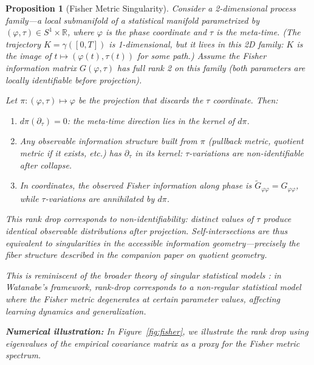 \documentclass[12pt]{article}
\newtheorem{proposition}[theorem]{Proposition}
\newcommand{\R}{\mathbb{R}}
\begin{document}
\begin{proposition}[Fisher Metric Singularity]\label{prop:fisher}
Consider a 2-dimensional process family---a local submanifold of a statistical manifold parametrized by $(\varphi, \tau) \in S^1 \times \R$, where $\varphi$ is the phase coordinate and $\tau$ is the meta-time. (The trajectory $K = \gamma([0,T])$ is 1-dimensional, but it lives in this 2D family: $K$ is the image of $t \mapsto (\varphi(t), \tau(t))$ for some path.) Assume the Fisher information matrix $G(\varphi, \tau)$ has full rank 2 on this family (both parameters are locally identifiable before projection).

Let $\pi: (\varphi, \tau) \mapsto \varphi$ be the projection that discards the $\tau$ coordinate. Then:
\begin{enumerate}
    \item[(i)] $d\pi(\partial_\tau) = 0$: the meta-time direction lies in the kernel of $d\pi$.
    \item[(ii)] Any observable information structure built from $\pi$ (pullback metric, quotient metric if it exists, etc.) has $\partial_\tau$ in its kernel: $\tau$-variations are \emph{non-identifiable} after collapse.
    \item[(iii)] In coordinates, the observed Fisher information along phase is $\tilde{G}_{\varphi\varphi} = G_{\varphi\varphi}$, while $\tau$-variations are annihilated by $d\pi$.
\end{enumerate}

This rank drop corresponds to \emph{non-identifiability}: distinct values of $\tau$ produce identical observable distributions after projection. Self-intersections are thus equivalent to singularities in the accessible information geometry---precisely the fiber structure described in the companion paper on quotient geometry.

This is reminiscent of the broader theory of singular statistical models \citep{watanabe2009algebraic}: in Watanabe's framework, rank-drop corresponds to a non-regular statistical model where the Fisher metric degenerates at certain parameter values, affecting learning dynamics and generalization.

\textbf{Numerical illustration:} In Figure~\ref{fig:fisher}, we illustrate the rank drop using eigenvalues of the empirical covariance matrix as a proxy for the Fisher metric spectrum.
\end{proposition}
\end{document}
